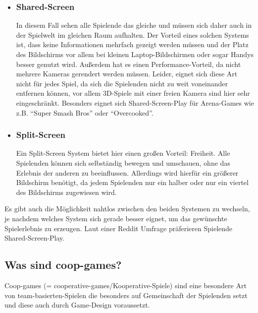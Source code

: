 \begin{itemize}
	
\item \subsubsection{Shared-Screen}

In diesem Fall sehen alle Spielende das gleiche und müssen sich daher auch in der Spielwelt im gleichen Raum aufhalten. Der Vorteil eines solchen Systems ist, dass keine Informationen mehrfach gezeigt werden müssen und der Platz des Bildschirms vor allem bei kleinen Laptop-Bildschirmen oder sogar Handys besser genutzt wird. Außerdem hat es einen Performance-Vorteil, da nicht mehrere Kameras gerendert werden müssen. Leider, eignet sich diese Art nicht für jedes Spiel, da sich die Spielenden nicht zu weit voneinander entfernen können, vor allem 3D-Spiele mit einer freien Kamera sind hier sehr eingeschränkt. Besonders eignet sich Shared-Screen-Play für Arena-Games wie z.B. "`Super Smash Bros"' oder "`Overcooked"'.

\item \subsubsection{Split-Screen}

Ein Split-Screen System bietet hier einen großen Vorteil: Freiheit. Alle Spielenden können sich selbständig bewegen und umschauen, ohne das Erlebnis der anderen zu beeinflussen. Allerdings wird hierfür ein größerer Bildschirm benötigt, da jedem Spielenden nur ein halber oder nur ein viertel des Bildschirms zugewiesen wird.

\end{itemize}

\noindent Es gibt auch die Möglichkeit nahtlos zwischen den beiden Systemen zu wechseln, je nachdem welches System sich gerade besser eignet, um das gewünschte Spielerlebnis zu erzeugen. Laut einer Reddit Umfrage präferieren Spielende Shared-Screen-Play\cite{_shared_or_splitscreen_preference}.

\subsection{Was sind coop-games?}

Coop-games (= cooperative-games/Kooperative-Spiele) sind eine besondere Art von team-basierten-Spielen die besonders auf Gemeinschaft der Spielenden setzt und diese auch durch Game-Design voraussetzt. 

